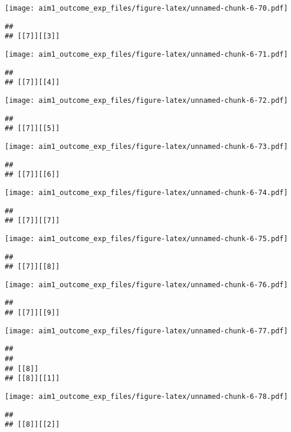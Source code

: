 \documentclass[
]{article}
\begin{document}
\texttt{[image: aim1\_outcome\_exp\_files/figure-latex/unnamed-chunk-6-70.pdf]}

\begin{verbatim}
## 
## [[7]][[3]]
\end{verbatim}

\texttt{[image: aim1\_outcome\_exp\_files/figure-latex/unnamed-chunk-6-71.pdf]}

\begin{verbatim}
## 
## [[7]][[4]]
\end{verbatim}

\texttt{[image: aim1\_outcome\_exp\_files/figure-latex/unnamed-chunk-6-72.pdf]}

\begin{verbatim}
## 
## [[7]][[5]]
\end{verbatim}

\texttt{[image: aim1\_outcome\_exp\_files/figure-latex/unnamed-chunk-6-73.pdf]}

\begin{verbatim}
## 
## [[7]][[6]]
\end{verbatim}

\texttt{[image: aim1\_outcome\_exp\_files/figure-latex/unnamed-chunk-6-74.pdf]}

\begin{verbatim}
## 
## [[7]][[7]]
\end{verbatim}

\texttt{[image: aim1\_outcome\_exp\_files/figure-latex/unnamed-chunk-6-75.pdf]}

\begin{verbatim}
## 
## [[7]][[8]]
\end{verbatim}

\texttt{[image: aim1\_outcome\_exp\_files/figure-latex/unnamed-chunk-6-76.pdf]}

\begin{verbatim}
## 
## [[7]][[9]]
\end{verbatim}

\texttt{[image: aim1\_outcome\_exp\_files/figure-latex/unnamed-chunk-6-77.pdf]}

\begin{verbatim}
## 
## 
## [[8]]
## [[8]][[1]]
\end{verbatim}

\texttt{[image: aim1\_outcome\_exp\_files/figure-latex/unnamed-chunk-6-78.pdf]}

\begin{verbatim}
## 
## [[8]][[2]]
\end{verbatim}
\end{document}
